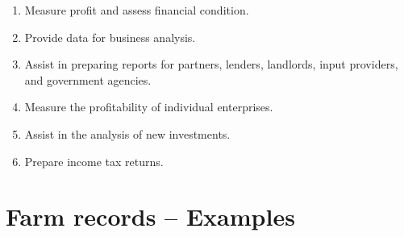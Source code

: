 \documentclass[12pt,ignorenonframetext,aspectratio=169]{beamer}
\providecommand{\tightlist}{%
  \setlength{\itemsep}{0pt}\setlength{\parskip}{0pt}}
\begin{document}
\begin{frame}{}
\protect\hypertarget{section-2}{}
\begin{enumerate}
\tightlist
\item
  Measure profit and assess financial condition.
\item
  Provide data for business analysis.
\item
  Assist in preparing reports for partners, lenders, landlords, input
  providers, and government agencies.
\item
  Measure the profitability of individual enterprises.
\item
  Assist in the analysis of new investments.
\item
  Prepare income tax returns.
\end{enumerate}
\end{frame}

\hypertarget{farm-records-examples}{%
\section{Farm records -- Examples}\label{farm-records-examples}}
\end{document}
